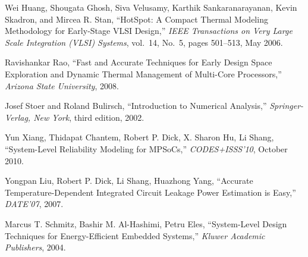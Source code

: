 \begin{thebibliography}{9}
    Wei Huang, Shougata Ghosh, Siva Velusamy, Karthik Sankaranarayanan, Kevin Skadron, and Mircea R. Stan,
    ``HotSpot: A Compact Thermal Modeling Methodology for Early-Stage VLSI Design,''
    \emph{IEEE Transactions on Very Large Scale Integration (VLSI) Systems},
    vol.~14, No.~5, pages 501--513, May 2006.

    Ravishankar Rao,
    ``Fast and Accurate Techniques for Early Design Space Exploration and Dynamic Thermal Management of Multi-Core Processors,''
    \emph{Arizona State University},
    2008.

    Josef Stoer and Roland Bulirsch,
    ``Introduction to Numerical Analysis,''
    \emph{Springer-Verlag, New York},
    third edition, 2002.

    Yun Xiang, Thidapat Chantem, Robert P. Dick, X. Sharon Hu, Li Shang,
    ``System-Level Reliability Modeling for MPSoCs,''
    \emph{CODES+ISSS'10},
    October 2010.

    Yongpan Liu, Robert P. Dick, Li Shang, Huazhong Yang,
    ``Accurate Temperature-Dependent Integrated Circuit Leakage Power Estimation is Easy,''
    \emph{DATE'07},
    2007.

    Marcus T. Schmitz, Bashir M. Al-Hashimi, Petru Eles,
    ``System-Level Design Techniques for Energy-Efficient Embedded Systems,''
    \emph{Kluwer Academic Publishers},
    2004.
\end{thebibliography}
